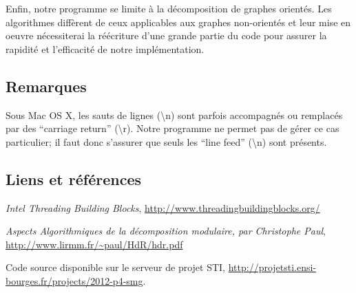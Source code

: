 \documentclass[pdftex,a4paper,titlepage,11pt,openright]{article}
\begin{document}
Enfin, notre programme se limite à la décomposition de graphes orientés. Les algorithmes diffèrent de ceux applicables aux graphes non-orientés et leur mise en oeuvre nécessiterai la réécriture d'une grande partie du code pour assurer la rapidité et l'efficacité de notre implémentation.


\newpage
{}
\subsection*{Remarques}

Sous Mac OS X, les sauts de lignes (\textbackslash n) sont parfois accompagnés ou remplacés par des ``carriage return'' (\textbackslash r). Notre programme ne permet pas de gérer ce cas particulier; il faut donc s'assurer que seuls les ``line feed'' (\textbackslash n) sont présents.

\subsection*{Liens et références}
\begin{thebibliography}{40}
 \textit{Intel Threading Building Blocks}, \url{http://www.threadingbuildingblocks.org/}

 \textit{Aspects Algorithmiques de la décomposition modulaire, par Christophe Paul}, \url{http://www.lirmm.fr/~paul/HdR/hdr.pdf}

 Code source disponible sur le serveur de projet STI, \url{http://projetsti.ensi-bourges.fr/projects/2012-p4-smg}.
\end{thebibliography}

\end{document}
